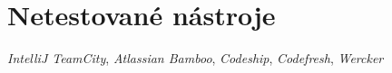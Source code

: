 \section{Netestované nástroje}
    \label{sec:others}

    \blind[2]

    \textit{IntelliJ TeamCity}, \textit{Atlassian Bamboo}, \textit{Codeship}, \textit{Codefresh}, \textit{Wercker}
